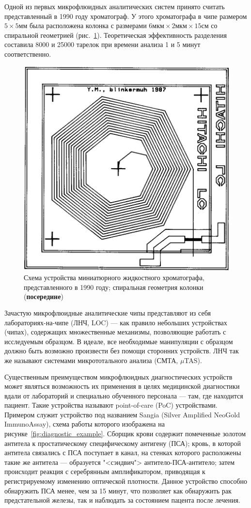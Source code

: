 \documentclass[oneside,final,12pt]{extreport}
\begin{document}
Одной из первых микрофлюидных аналитических систем принято считать
представленный в 1990 году хроматограф\cite{bib:early_chromatograph}.
У этого хроматографа в чипе размером $5\times5\text{мм}$ была
расположена
колонка с размерами
$6\text{мкм} \times 2\text{мкм} \times 15\text{см}$
со спиральной геометрией (рис.~\ref{fig:miniature_chromatograph_scheme}).
Теоретическая эффективность разделения составила 8000 и 25000 тарелок
при времени анализа 1 и 5 минут соответственно.

\begin{figure}
  \centering
  \includegraphics[width=.5\textwidth]{pic/miniature_chromatograph_scheme}

  \caption{%
    \label{fig:miniature_chromatograph_scheme}%
    Схема устройства миниатюрного жидкостного хроматографа, представленного в 1990 году;
    спиральная геометрия колонки (\textbf{посередине})
  }

\end{figure}

Зачастую микрофлюидные аналитические чипы представляют из себя
лабораториях-на-чипе (ЛНЧ, LOC) ---
как правило небольших устройствах (чипах), содержащих
множественные механизмы, позволяющие работать с исследуемым образцом.
В идеале, все необходимые манипуляции с образцом должно быть возможно произвести
без помощи сторонних устройств.
ЛНЧ так же называют системами микрототального анализа (СМТА, $\mu$TAS).

Существенным преимуществом микрофлюидных диагностических устройств
может являться возможность их применения в целях медицинской диагностики
вдали от лабораторий и специально обученного персонала --- там,
где находится пациент.
Такие устройства называют point-of-care (PoC) устройствами.
Примером служит устройство под названием
Sangia (Silver Amplified NeoGold ImmunoAssay)\cite{bib:poc_rsa},
схема работы которого изображена на рисунке~\ref{fig:diagnostic_example}.
Сборщик крови содержит помеченные золотом антитела
к простатическому специфическому антигену (ПСА);
кровь, в которой антитела связались с ПСА поступает в канал,
на стенках которого расположены такие же антитела ---
образуется "<сэндвич"> антитело-ПСА-антитело;
затем происходит реакция с серебрянным амплификатором,
приводящая к регистрируемому изменению оптической плотности.
Данное устройство способно обнаружить ПСА менее, чем за 15 минут,
что позволяет как обнаружить рак предстательной железы,
так и наблюдать за состоянием пацента после лечения.
\end{document}
